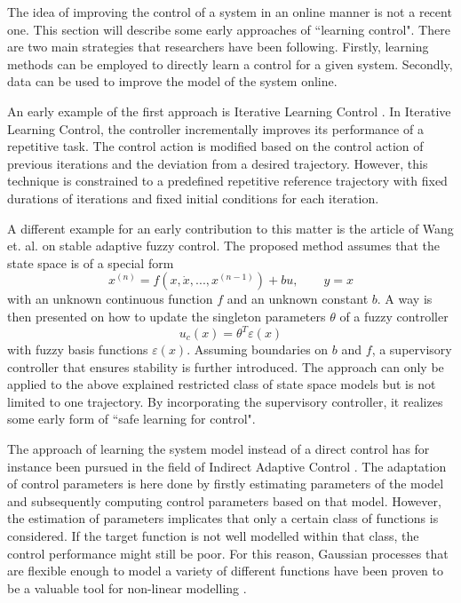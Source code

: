 \documentclass[../main.tex]{subfiles}
\begin{document}
The idea of improving the control of a system in an online manner is not a recent one. This section will describe some early approaches of ``learning control". There are two main strategies that researchers have been following. Firstly, learning methods can be employed to directly learn a control for a given system. Secondly, data can be used to improve the model of the system online.\par

An early example of the first approach is Iterative Learning Control \cite{aastrom2013adaptive}. In Iterative Learning Control, the controller incrementally improves its performance of a repetitive task. The control action is modified based on the control action of previous iterations and the deviation from a desired trajectory. However, this technique is constrained to a predefined repetitive reference trajectory with fixed durations of iterations and fixed initial conditions for each iteration.

A different example for an early contribution to this matter is the article of Wang et. al. \cite{wang1993stable} on stable adaptive fuzzy control. The proposed method assumes that the state space is of a special form
\begin{equation}
    x^{(n)} = f(x, \dot{x}, ..., x^{(n-1)})+bu, \qquad y=x
\end{equation}
with an unknown continuous function $f$ and an unknown constant $b$. A way is then presented on how to update the singleton parameters $\theta$ of a fuzzy controller
\begin{equation}
    u_c(x) = \theta^T \varepsilon(x)
\end{equation}
with fuzzy basis functions $\varepsilon(x)$. Assuming boundaries on $b$ and $f$, a supervisory controller that ensures stability is further introduced. The approach can only be applied to the above explained restricted class of state space models but is not limited to one trajectory. By incorporating the supervisory controller, it realizes some early form of ``safe learning for control".\par


The approach of learning the system model instead of a direct control has for instance been pursued in the field of Indirect Adaptive Control \cite{aastrom2013adaptive}. The adaptation of control parameters is here done by firstly estimating parameters of the model and subsequently computing control parameters based on that model. However, the estimation of parameters implicates that only a certain class of functions is considered. If the target function is not well modelled within that class, the control performance might still be poor. For this reason, Gaussian processes that are flexible enough to model a variety of different functions have been proven to be a valuable tool for non-linear modelling \cite{murphy2012machine}.\par
\end{document}
